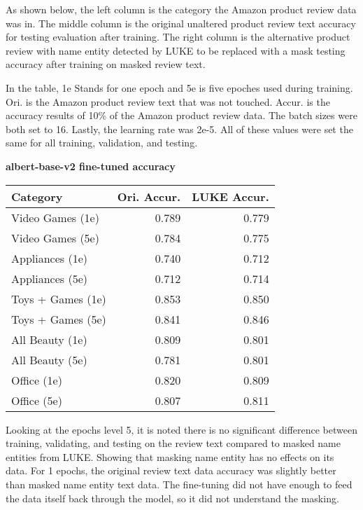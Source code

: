 \documentclass[11pt,a4paper]{article}
\begin{document}
As shown below, the left column is the category the Amazon product review data was in. The middle column is the original unaltered product review text accuracy for testing evaluation after training. The right column is the alternative product review with name entity detected by LUKE to be replaced with a mask testing accuracy after training on masked review text.

In the table, 1e Stands for one epoch and 5e is five epoches used during training. Ori. is the Amazon product review text that was not touched. Accur. is the accuracy results of 10\% of the Amazon product review data. The batch sizes were both set to 16. Lastly, the learning rate was 2e-5. All of these values were set the same for all training, validation, and testing. \\

\begin{center}
\textbf{albert-base-v2 fine-tuned accuracy}
\noindent\begin{tabular}{|l|r|r|}
\hline
 Category & Ori. Accur. & LUKE Accur. \\
\hline
Video Games (1e)    & 0.789       & 0.779       \\
Video Games (5e)    & 0.784       & 0.775       \\
Appliances (1e)     & 0.740       & 0.712       \\
Appliances (5e)     & 0.712       & 0.714       \\
Toys + Games (1e)   & 0.853       & 0.850       \\
Toys + Games (5e)   & 0.841       & 0.846       \\
All Beauty (1e)     & 0.809       & 0.801       \\
All Beauty (5e)     & 0.781       & 0.801       \\
Office (1e)         & 0.820       & 0.809       \\
Office (5e)         & 0.807       & 0.811       \\
\hline
\end{tabular}
\end{center}

Looking at the epochs level 5, it is noted there is no significant difference between training, validating, and testing on the review text compared to masked name entities from LUKE. Showing that masking name entity has no effects on its data. For 1 epochs, the original review text data accuracy was slightly better than masked name entity text data. The fine-tuning did not have enough to feed the data itself back through the model, so it did not understand the masking.
\end{document}
